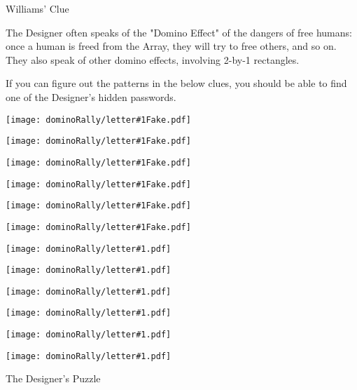 \documentclass{article}
\newcommand{\dominoLetter}[1]{
\texttt{[image: dominoRally/letter\#1.pdf]}
\hspace{0.03\linewidth}
}
\newcommand{\undominoLetter}[1]{
\texttt{[image: dominoRally/letter\#1Fake.pdf]}
\hspace{0.03\linewidth}
}
\begin{document}
\newpage

Williams' Clue

The Designer often speaks of the "Domino Effect" of the
dangers of free humans: once a human is freed from the
Array, they will
try to free others, and so on. They also speak of other
domino effects, involving 2-by-1 rectangles.

If you can figure out the patterns in the below clues,
you should be able to find one of the Designer's
hidden passwords.

\begin{center}

\undominoLetter{V}%
\undominoLetter{O}%
\undominoLetter{W}%
\undominoLetter{E}%
\undominoLetter{L}%
\undominoLetter{S}%

\vspace{3em}

\dominoLetter{O}%
\dominoLetter{T}%
\dominoLetter{H}%
\dominoLetter{E}%
\dominoLetter{R}%
\dominoLetter{S}%

\end{center}


\newpage

The Designer's Puzzle
\end{document}
